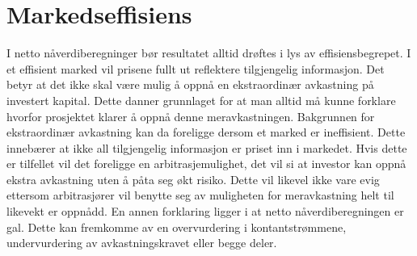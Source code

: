 \section{Markedseffisiens}
I netto nåverdiberegninger bør resultatet alltid drøftes i lys av effisiensbegrepet. I et effisient marked vil prisene fullt ut reflektere tilgjengelig informasjon. Det betyr at det ikke skal være mulig å oppnå en ekstraordinær avkastning på investert kapital. Dette danner grunnlaget for at man alltid må kunne forklare hvorfor prosjektet klarer å oppnå denne meravkastningen. Bakgrunnen for ekstraordinær avkastning kan da foreligge dersom et marked er ineffisient. Dette innebærer at ikke all tilgjengelig informasjon er priset inn i markedet. Hvis dette er tilfellet vil det foreligge en arbitrasjemulighet, det vil si at investor kan oppnå ekstra avkastning uten å påta seg økt risiko. Dette vil likevel ikke vare evig ettersom arbitrasjører vil benytte seg av muligheten for meravkastning helt til likevekt er oppnådd. En annen forklaring ligger i at netto nåverdiberegningen er gal. Dette kan fremkomme av en overvurdering i kontantstrømmene, undervurdering av avkastningskravet eller begge deler.




